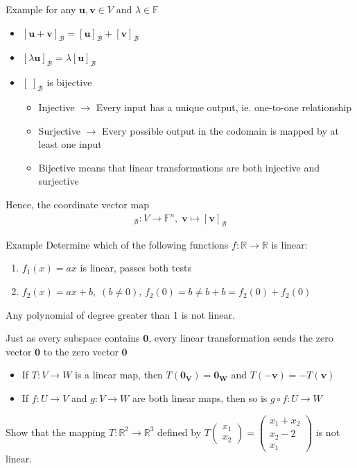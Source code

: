 \documentclass{report}
\renewcommand{\vec}{\mathbf}
\newcommand{\cvec}[1]{ \begin{pmatrix} #1 \end{pmatrix} }
\begin{document}
\begin{enumerate}
\begin{question}{Example}
		for any $\vec{u}, \vec{v} \in V$ and $\lambda \in \mathbb{F}$
		\begin{itemize}
			\item $[\vec{u} + \vec{v}]_\mathcal{B} = [\vec{u}]_\mathcal{B} + [\vec{v}]_\mathcal{B}$
			\item $[\lambda \vec{u}]_\mathcal{B} = \lambda [\vec{u}]_\mathcal{B}$
			\item $[\;]_\mathcal{B}$ is bijective
				\begin{itemize}
					\item Injective $\rightarrow$ Every input has a unique output, ie. one-to-one relationship
					\item Surjective $\rightarrow$ Every possible output in the codomain is mapped by at least one input
					\item Bijective means that linear transformations are both injective and surjective
				\end{itemize}
		\end{itemize}
		Hence, the coordinate vector map
		\begin{align*}
			[\;]_\mathcal{B}: V \to \mathbb{F}^n, \; \vec{v} \mapsto [\vec{v}]_\mathcal{B}
		\end{align*}
	\end{question}
	\begin{question}{Example}
		Determine which of the following functions $f: \mathbb{R} \to \mathbb{R}$ is linear:
		\begin{enumerate}
			\item $f_1(x) = ax$ is linear, passes both tests
			\item $f_2(x) = ax + b, \; (b \neq 0)$, $f_2(0) = b \neq b + b = f_2(0) + f_2(0)$
		\end{enumerate}
		Any polynomial of degree greater than 1 is not linear.
	\end{question}

	Just as every subspace contains $\vec{0}$, every linear transformation sends the zero vector $\vec{0}$ to the zero vector $\vec{0}$
	\begin{itemize}
		\item If $T: V \to W$ is a linear map, then $T(\vec{0_V}) = \vec{0_W}$ and $T(-\vec{v}) = -T(\vec{v})$
		\item If $f: U \to V$ and $g: V \to W$ are both linear maps, then so is $g \circ f: U \to W$
	\end{itemize}

	Show that the mapping $T: \mathbb{R}^2 \to \mathbb{R}^3$ defined by $T\cvec{x_1\\x_2} = \cvec{x_1 + x_2\\x_2-2\\x_1}$ is not linear.


\end{enumerate}
\end{document}
